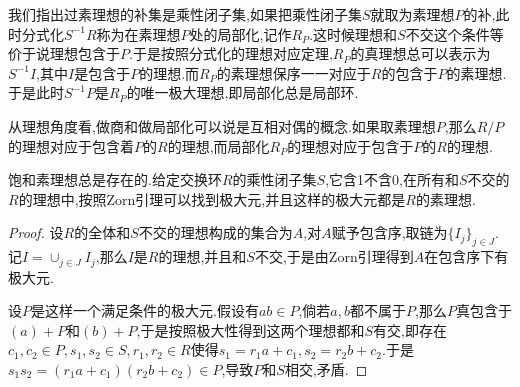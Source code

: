 我们指出过素理想的补集是乘性闭子集,如果把乘性闭子集$S$就取为素理想$P$的补,此时分式化$S^{-1}R$称为在素理想$P$处的局部化,记作$R_P$.这时候理想和$S$不交这个条件等价于说理想包含于$P$.于是按照分式化的理想对应定理,$R_P$的真理想总可以表示为$S^{-1}I$,其中$I$是包含于$P$的理想.而$R_P$的素理想保序一一对应于$R$的包含于$P$的素理想.于是此时$S^{-1}P$是$R_P$的唯一极大理想,即局部化总是局部环.

从理想角度看,做商和做局部化可以说是互相对偶的概念.如果取素理想$P$,那么$R/P$的理想对应于包含着$P$的$R$的理想,而局部化$R_P$的理想对应于包含于$P$的$R$的理想.

饱和素理想总是存在的.给定交换环$R$的乘性闭子集$S$,它含1不含0,在所有和$S$不交的$R$的理想中,按照Zorn引理可以找到极大元,并且这样的极大元都是$R$的素理想.
\begin{proof}
	
	设$R$的全体和$S$不交的理想构成的集合为$A$,对$A$赋予包含序,取链为$\{I_j\}_{j\in J}$.记$I=\cup_{j\in J}I_j$,那么$I$是$R$的理想,并且和$S$不交,于是由Zorn引理得到$A$在包含序下有极大元.
	
	设$P$是这样一个满足条件的极大元.假设有$ab\in P$,倘若$a,b$都不属于$P$,那么$P$真包含于$(a)+P$和$(b)+P$,于是按照极大性得到这两个理想都和$S$有交,即存在$c_1,c_2\in P,s_1,s_2\in S,r_1,r_2\in R$使得$s_1=r_1a+c_1,s_2=r_2b+c_2$.于是$s_1s_2=(r_1a+c_1)(r_2b+c_2)\in P$,导致$P$和$S$相交,矛盾.
\end{proof}

